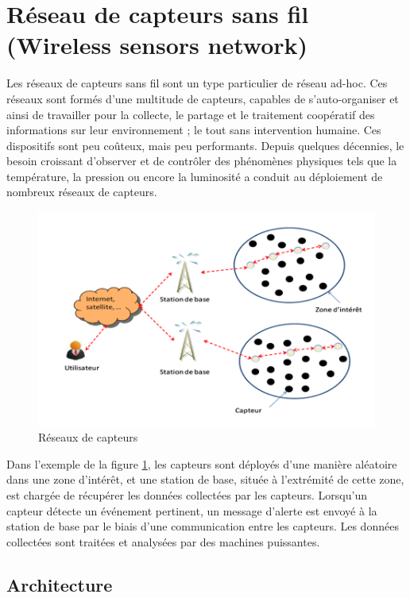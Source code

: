 \section{Réseau de capteurs sans fil (Wireless sensors network)}
Les réseaux de capteurs sans fil sont un type particulier de réseau ad-hoc. Ces réseaux sont formés d’une multitude de capteurs, capables de s’auto-organiser et ainsi de travailler pour la collecte, le partage et le traitement coopératif des informations sur leur environnement ; le tout sans intervention humaine. Ces dispositifs sont peu coûteux, mais peu performants. Depuis quelques décennies, le besoin croissant d’observer et de contrôler des phénomènes physiques tels que la température, la pression ou encore la luminosité a conduit au déploiement de nombreux réseaux de capteurs.

\begin{figure}[h]
\centering
\includegraphics[scale=0.8]{Intro/WSN}
\caption{\label{WSN} Réseaux de capteurs}
\end{figure}

Dans l'exemple de la figure \ref{WSN}, les capteurs sont déployés d’une manière aléatoire dans une zone d’intérêt, et une station de base, située à l’extrémité de cette zone, est chargée de récupérer les données collectées par les capteurs. Lorsqu’un capteur détecte un événement pertinent, un message d’alerte est envoyé à la station de base par le biais d’une  communication entre les capteurs. Les données collectées sont traitées et analysées par des machines puissantes.



\subsection{Architecture}



